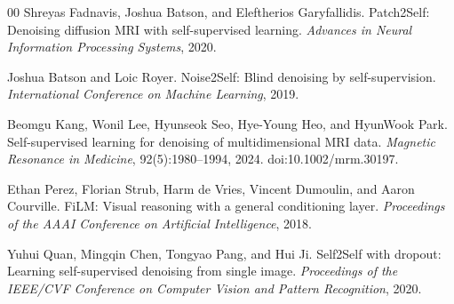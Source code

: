 \documentclass[preprint,12pt]{elsarticle}
\begin{document}
\begin{thebibliography}{00}
  Shreyas Fadnavis, Joshua Batson, and Eleftherios Garyfallidis.
  Patch2Self: Denoising diffusion MRI with self-supervised learning.
  \emph{Advances in Neural Information Processing Systems}, 2020.

  Joshua Batson and Loic Royer.
  Noise2Self: Blind denoising by self-supervision.
  \emph{International Conference on Machine Learning}, 2019.

  Beomgu Kang, Wonil Lee, Hyunseok Seo, Hye-Young Heo, and HyunWook Park.
  Self-supervised learning for denoising of multidimensional MRI data.
  \emph{Magnetic Resonance in Medicine}, 92(5):1980--1994, 2024.
  doi:10.1002/mrm.30197.

  Ethan Perez, Florian Strub, Harm de Vries, Vincent Dumoulin, and Aaron Courville.
  FiLM: Visual reasoning with a general conditioning layer.
  \emph{Proceedings of the AAAI Conference on Artificial Intelligence}, 2018.

  Yuhui Quan, Mingqin Chen, Tongyao Pang, and Hui Ji.
  Self2Self with dropout: Learning self-supervised denoising from single image.
  \emph{Proceedings of the IEEE/CVF Conference on Computer Vision and Pattern Recognition}, 2020.

\end{thebibliography}
\end{document}
